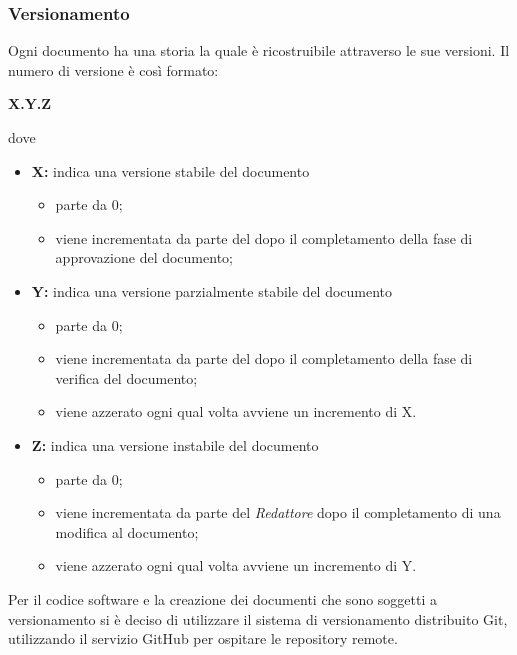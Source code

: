 \subsubsection{Versionamento}
Ogni documento ha una storia la quale è ricostruibile attraverso le sue versioni. Il numero di versione è così formato:
\begin{center}
\textbf{X.Y.Z}
\end{center}
dove
\begin{itemize}
 \item \textbf{X:} indica una versione stabile del documento
 	\begin{itemize}
 		\item parte da 0;
 		\item viene incrementata da parte del \respProg{} dopo il completamento della fase di approvazione del documento;
 	\end{itemize}
 \item \textbf{Y:}  indica una versione parzialmente stabile del documento
 	\begin{itemize}
 		\item parte da 0;
 		\item viene incrementata da parte del \verifProg{} dopo il completamento della fase di verifica del documento;
 		\item viene azzerato ogni qual volta avviene un incremento di X.
 	\end{itemize}
 \item \textbf{Z:} indica una versione instabile del documento
 \begin{itemize}
 		\item parte da 0;
 		\item viene incrementata da parte del \emph{Redattore} dopo il completamento di una modifica al documento;
 		\item viene azzerato ogni qual volta avviene un incremento di Y.
 	\end{itemize}
\end{itemize}

Per il codice software e la creazione dei documenti che sono soggetti a versionamento si è deciso di utilizzare il sistema di versionamento distribuito Git, utilizzando il servizio GitHub per ospitare le repository remote.


